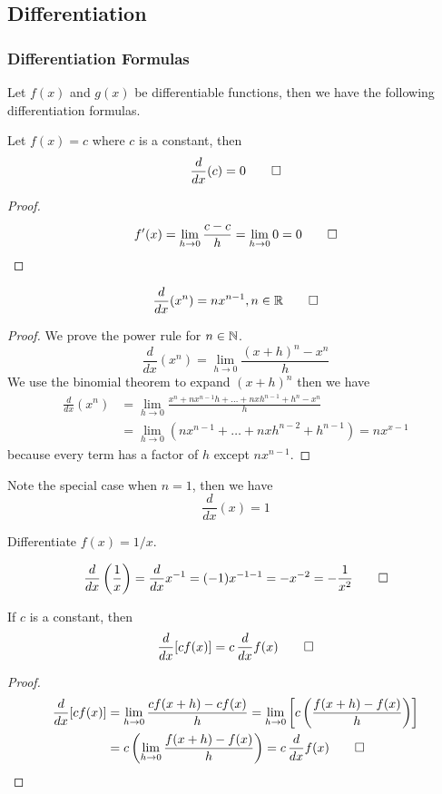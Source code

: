 \subsection{Differentiation}
\subsubsection{Differentiation Formulas}
Let \(f(x)\) and \(g(x)\) be differentiable functions, then we have the
following differentiation formulas.
\begin{theorem}
    Let \(f(x)=c\) where \(c\) is a constant, then \[\frac{d}{dx}(c)=0\qedhere\]
\end{theorem}
\begin{proof}
    \[f'(x)=\lim_{h\to 0}\frac{c-c}{h}=\lim_{h\to 0}0=0\qedhere\]
\end{proof}
\begin{theorem}
    \[\frac{d}{dx}(x^n)=nx^{n-1},n\in\mathbb{R}\qedhere\]
\end{theorem}
\begin{proof}
    We prove the power rule for \(n\in\mathbb{N}\).
    \[\frac{d}{dx}(x^n)=\lim_{h\to 0}\frac{(x+h)^n-x^n}{h}\]
    We use the binomial theorem to expand \((x+h)^n\) then we have
    \begin{align*}
        \frac{d}{dx}(x^n)
        &=\lim_{h\to 0}\frac{x^n+nx^{n-1}h+\dots+nxh^{n-1}+h^n-x^n}{h}\\
        &=\lim_{h\to 0}(nx^{n-1}+\dots+nxh^{n-2}+h^{n-1})=nx^{x-1}
    \end{align*}
    because every term has a factor of \(h\) except \(nx^{n-1}\).
\end{proof}
Note the special case when \(n=1\), then we have \[\frac{d}{dx}(x)=1\]
\begin{problem}
    Differentiate \(f(x)=1/x\).
\end{problem}
\begin{solution}
    \[\frac{d}{dx}\left(\frac{1}{x}\right)=\frac{d}{dx}x^{-1}=(-1)x^{-1-1}
    =-x^{-2}=-\frac{1}{x^2}\qedhere\]
\end{solution}
\begin{theorem}
    If \(c\) is a constant, then \[\frac{d}{dx}[cf(x)]=c\,\frac{d}{dx}f(x)\qedhere\]
\end{theorem}
\begin{proof}
    \begin{align*}
        \frac{d}{dx}[cf(x)]&=\lim_{h\to 0}\frac{cf(x+h)-cf(x)}{h}
        =\lim_{h\to 0}\left[c\left(\frac{f(x+h)-f(x)}{h}\right)\right]\\
        &=c\left(\lim_{h\to 0}\frac{f(x+h)-f(x)}{h}\right)
        =c\,\frac{d}{dx}f(x)\qedhere
    \end{align*}
\end{proof}
